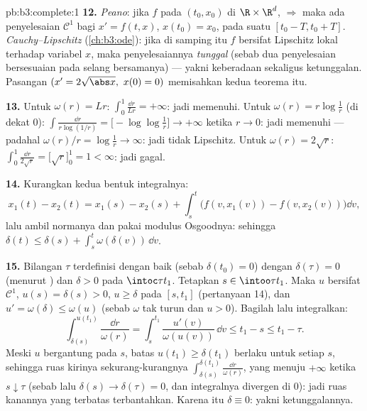\begin{solution}{pb:b3:complete:1}
\textbf{12.} \emph{Peano}: jika $f$  pada 
$(t_0, x_0)$ di $\R\times\R^d$, $\Rightarrow$ maka ada penyelesaian
$\mathcal C^1$ bagi $x' = f(t,x)$, $x(t_0) = x_0$, pada
suatu $[t_0 - T, t_0 + T]$. \emph{Cauchy--Lipschitz}
(\cref{ch:b3:ode}): jika di samping itu $f$ bersifat Lipschitz lokal terhadap
variabel $x$, maka penyelesaiannya \emph{tunggal} (sebab dua penyelesaian bersesuaian pada
selang bersamanya) --- yakni keberadaan sekaligus ketunggalan. Pasangan
$(x' = 2\sqrt{\abs x},\ x(0) = 0)$ memisahkan kedua teorema itu.

\textbf{13.} Untuk $\omega(r) = Lr$: $\int_0^1\frac{\dd r}{Lr} =
+\infty$: jadi memenuhi. Untuk $\omega(r) = r\log\frac1r$ (di dekat $0$):
$\int\frac{\dd r}{r\log(1/r)} = \bigl[-\log\log\frac1r\bigr]
\to +\infty$ ketika $r \to 0$: jadi memenuhi --- padahal $\omega(r)/r =
\log\frac1r \to \infty$: jadi tidak Lipschitz. Untuk $\omega(r) = 2\sqrt
r$: $\int_0^1\frac{\dd r}{2\sqrt r} = \bigl[\sqrt r\bigr]_0^1
= 1 < \infty$: jadi gagal.

\textbf{14.} Kurangkan kedua bentuk integralnya:
\[
x_1(t) - x_2(t) = x_1(s) - x_2(s) + \int_s^t\bigl(f(v,
x_1(v)) - f(v, x_2(v))\bigr)\dd v,
\]
lalu ambil normanya dan pakai modulus Osgoodnya: sehingga $\delta(t) \leq
\delta(s) + \int_s^t\omega(\delta(v))\,\dd v$.

\textbf{15.} Bilangan $\tau$ terdefinisi dengan baik (sebab $\delta(t_0) = 0$) dengan
$\delta(\tau) = 0$ (menurut ) dan $\delta > 0$ pada
$\intoc\tau{t_1}$. Tetapkan $s \in \intoo\tau{t_1}$. Maka $u$ bersifat
$\mathcal C^1$, $u(s) = \delta(s) > 0$, $u \geq \delta$ pada
$[s, t_1]$ (pertanyaan 14), dan $u' = \omega(\delta) \leq
\omega(u)$ (sebab $\omega$ tak turun dan $u > 0$). Bagilah lalu
integralkan:
\[
\int_{\delta(s)}^{u(t_1)}\frac{\dd r}{\omega(r)}
= \int_s^{t_1}\frac{u'(v)}{\omega(u(v))}\,\dd v \leq t_1 - s
\leq t_1 - \tau .
\]
Meski $u$ bergantung pada $s$, batas $u(t_1) \geq
\delta(t_1)$ berlaku untuk setiap $s$, sehingga ruas kirinya sekurang-kurangnya
$\int_{\delta(s)}^{\delta(t_1)}\frac{\dd r}{\omega(r)}$,
yang menuju $+\infty$ ketika $s \downarrow \tau$ (sebab lalu
$\delta(s) \to \delta(\tau) = 0$, dan integralnya divergen
di $0$): jadi ruas kanannya yang terbatas terbantahkan. Karena itu
$\delta \equiv 0$: yakni ketunggalannya.


\end{solution}

